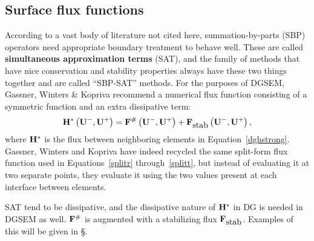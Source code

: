 \subsection{Surface flux functions}%
According to a vast body of literature not cited here, summation-by-parts (SBP)
operators need appropriate boundary treatment to behave well. These are
called \textbf{simultaneous approximation terms} (SAT), and the family of
methods that have nice conservation and stability properties always have these
two things together and are called ``SBP-SAT'' methods. For the purposes of
DGSEM, Gassner, Winters \& Kopriva \cite[Eq]{} recommend a numerical flux
function consisting of a symmetric function and an extra dissipative term:
\begin{equation}
{\bf H}^{\ast}\left({\bf U}^-,{\bf U}^+\right)=\mathbf{F}^{\#}\left({\bf U}^-,{\bf U}^+\right)+\mathbf{F}_{\mbox{stab}}\left({\bf U}^-,{\bf U}^+\right),
\label{numfluxfinally}
\end{equation}
where ${\bf H}^{\ast}$ is the flux between neighboring elements
in Equation~\ref{dghstrong}. Gassner, Winters and Kopriva have indeed recycled
the same split-form flux function used in Equations~\ref{splitr} through~\ref{splitt},
but instead of evaluating it at two separate points, they evaluate it using the
two values present at each interface between elements.

SAT tend to be dissipative, and the dissipative nature of ${\bf H}^{\ast}$ in
DG is needed in DGSEM as well. ${\bf F}^{\#}$ is augmented with a stabilizing
flux ${\bf F}_{\mbox{stab}}$. Examples of this will be given in \S.
